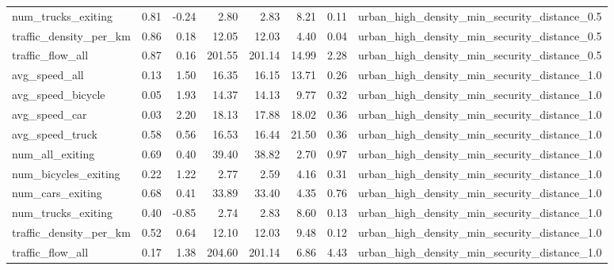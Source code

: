 \begin{table}[ht]
\begin{tabular}{lrrrrrrl}
  num\_trucks\_exiting & 0.81 & -0.24 & 2.80 & 2.83 & 8.21 & 0.11 & urban\_high\_density\_min\_security\_distance\_0.5 \\ 
  traffic\_density\_per\_km & 0.86 & 0.18 & 12.05 & 12.03 & 4.40 & 0.04 & urban\_high\_density\_min\_security\_distance\_0.5 \\ 
  traffic\_flow\_all & 0.87 & 0.16 & 201.55 & 201.14 & 14.99 & 2.28 & urban\_high\_density\_min\_security\_distance\_0.5 \\ 
  avg\_speed\_all & 0.13 & 1.50 & 16.35 & 16.15 & 13.71 & 0.26 & urban\_high\_density\_min\_security\_distance\_1.0 \\ 
  avg\_speed\_bicycle & 0.05 & 1.93 & 14.37 & 14.13 & 9.77 & 0.32 & urban\_high\_density\_min\_security\_distance\_1.0 \\ 
  avg\_speed\_car & 0.03 & 2.20 & 18.13 & 17.88 & 18.02 & 0.36 & urban\_high\_density\_min\_security\_distance\_1.0 \\ 
  avg\_speed\_truck & 0.58 & 0.56 & 16.53 & 16.44 & 21.50 & 0.36 & urban\_high\_density\_min\_security\_distance\_1.0 \\ 
  num\_all\_exiting & 0.69 & 0.40 & 39.40 & 38.82 & 2.70 & 0.97 & urban\_high\_density\_min\_security\_distance\_1.0 \\ 
  num\_bicycles\_exiting & 0.22 & 1.22 & 2.77 & 2.59 & 4.16 & 0.31 & urban\_high\_density\_min\_security\_distance\_1.0 \\ 
  num\_cars\_exiting & 0.68 & 0.41 & 33.89 & 33.40 & 4.35 & 0.76 & urban\_high\_density\_min\_security\_distance\_1.0 \\ 
  num\_trucks\_exiting & 0.40 & -0.85 & 2.74 & 2.83 & 8.60 & 0.13 & urban\_high\_density\_min\_security\_distance\_1.0 \\ 
  traffic\_density\_per\_km & 0.52 & 0.64 & 12.10 & 12.03 & 9.48 & 0.12 & urban\_high\_density\_min\_security\_distance\_1.0 \\ 
  traffic\_flow\_all & 0.17 & 1.38 & 204.60 & 201.14 & 6.86 & 4.43 & urban\_high\_density\_min\_security\_distance\_1.0 \\ 
   \hline
\end{tabular}
\end{table}
